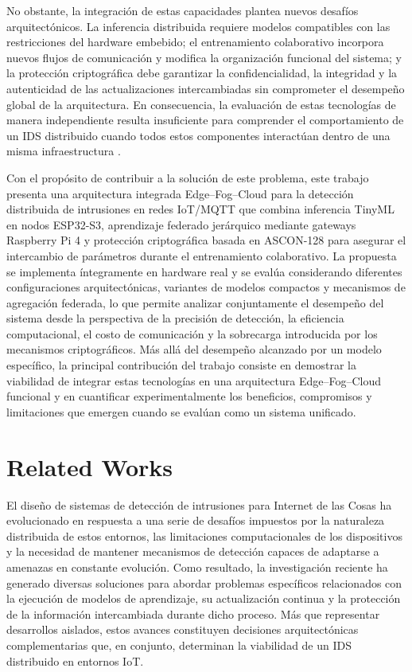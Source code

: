 \documentclass[journal,article,submit,moreauthors]{Definitions/mdpi}
\begin{document}
No obstante, la integración de estas capacidades plantea nuevos desafíos arquitectónicos. La inferencia distribuida requiere modelos compatibles con las restricciones del hardware embebido; el entrenamiento colaborativo incorpora nuevos flujos de comunicación y modifica la organización funcional del sistema; y la protección criptográfica debe garantizar la confidencialidad, la integridad y la autenticidad de las actualizaciones intercambiadas sin comprometer el desempeño global de la arquitectura. En consecuencia, la evaluación de estas tecnologías de manera independiente resulta insuficiente para comprender el comportamiento de un IDS distribuido cuando todos estos componentes interactúan dentro de una misma infraestructura \cite{Alshammari2026,Dritsas2025}.

Con el propósito de contribuir a la solución de este problema, este trabajo presenta una arquitectura integrada Edge--Fog--Cloud para la detección distribuida de intrusiones en redes IoT/MQTT que combina inferencia TinyML en nodos ESP32-S3, aprendizaje federado jerárquico mediante gateways Raspberry Pi 4 y protección criptográfica basada en ASCON-128 para asegurar el intercambio de parámetros durante el entrenamiento colaborativo. La propuesta se implementa íntegramente en hardware real y se evalúa considerando diferentes configuraciones arquitectónicas, variantes de modelos compactos y mecanismos de agregación federada, lo que permite analizar conjuntamente el desempeño del sistema desde la perspectiva de la precisión de detección, la eficiencia computacional, el costo de comunicación y la sobrecarga introducida por los mecanismos criptográficos. Más allá del desempeño alcanzado por un modelo específico, la principal contribución del trabajo consiste en demostrar la viabilidad de integrar estas tecnologías en una arquitectura Edge--Fog--Cloud funcional y en cuantificar experimentalmente los beneficios, compromisos y limitaciones que emergen cuando se evalúan como un sistema unificado.

\section{Related Works}
\label{related}

El diseño de sistemas de detección de intrusiones para Internet de las Cosas ha evolucionado en respuesta a una serie de desafíos impuestos por la naturaleza distribuida de estos entornos, las limitaciones computacionales de los dispositivos y la necesidad de mantener mecanismos de detección capaces de adaptarse a amenazas en constante evolución. Como resultado, la investigación reciente ha generado diversas soluciones para abordar problemas específicos relacionados con la ejecución de modelos de aprendizaje, su actualización continua y la protección de la información intercambiada durante dicho proceso. Más que representar desarrollos aislados, estos avances constituyen decisiones arquitectónicas complementarias que, en conjunto, determinan la viabilidad de un IDS distribuido en entornos IoT.
\end{document}
